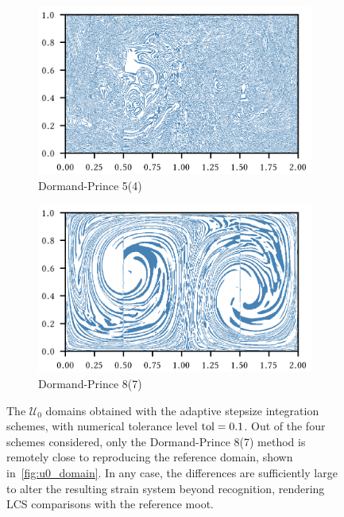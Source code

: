 \begin{figure}[htpb]
    \begin{subfigure}[b]{0.475\textwidth}
        \centering
        \includegraphics{figures/domain_figures/rkdp54_err_half_width.png}
        \caption[]{{\small Dormand-Prince 5(4)}}
        \label{fig:u0_dom_err_dp54}
    \end{subfigure}
    \begin{subfigure}[b]{0.475\textwidth}
        \centering
        \includegraphics{figures/domain_figures/rkdp87_err_half_width.png}
        \caption[]{{\small Dormand-Prince 8(7)}}
        \label{fig:u0_dom_err_dp87}
    \end{subfigure}
    \caption[The $\mathcal{U}_{0}$ domains obtained with the adaptive stepsize
    integration schemes, with numerical tolerance level
    $\textnormal{tol}=0.1$]{
        The $\mathcal{U}_{0}$ domains obtained with the adaptive stepsize
        integration schemes, with numerical tolerance level
    $\textnormal{tol}=0.1$. Out of the four schemes considered, only the
    Dormand-Prince 8(7) method is remotely close to reproducing the
    reference domain, shown in~\ref{fig:u0_domain}. In any case, the
    differences are sufficiently large to alter the resulting strain
    system beyond recognition, rendering LCS comparisons with the reference
    moot.}
    \label{fig:u0_dom_errs}
\end{figure}

